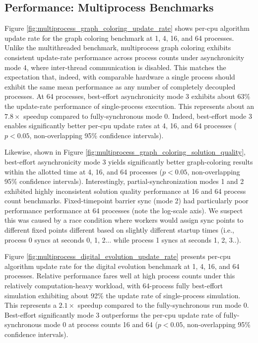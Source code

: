 \subsection{Performance: Multiprocess Benchmarks}



Figure \ref{fig:multiprocess_graph_coloring_update_rate} shows per-cpu algorithm update rate for the graph coloring benchmark at 1, 4, 16, and 64 processes.
Unlike the multithreaded benchmark, multiprocess graph coloring exhibits consistent update-rate performance across process counts under asynchronicity mode 4, where inter-thread communication is disabled.
This matches the expectation that, indeed, with comparable hardware a single process should exhibit the same mean performance as any number of completely decoupled processes.
At 64 processes, best-effort asynchronicity mode 3 exhibits about 63\% the update-rate performance of single-process execution.
This represents about an $7.8\times$ speedup compared to fully-synchronous mode 0.
Indeed, best-effort mode 3 enables significantly better per-cpu update rates at 4, 16, and 64 processes ($p < 0.05$, non-overlapping 95\% confidence intervals).

Likewise, shown in Figure \ref{fig:multiprocess_graph_coloring_solution_quality}, best-effort asynchronicity mode 3 yields significantly better graph-coloring results within the allotted time at 4, 16, and 64 processes ($p < 0.05$, non-overlapping 95\% confidence intervals).
Interestingly, partial-synchronization modes 1 and 2 exhibited highly inconsistent solution quality performance at 16 and 64 process count benchmarks.
Fixed-timepoint barrier sync (mode 2) had particularly poor performance performance at 64 processes (note the log-scale axis).
We suspect this was caused by a race condition where workers would assign sync points to different fixed points different based on slightly different startup times (i.e., process 0 syncs at seconds 0, 1, 2... while process 1 syncs at seconds 1, 2, 3..).

Figure \ref{fig:multiprocess_digital_evolution_update_rate} presents per-cpu algorithm update rate for the digital evolution benchmark at 1, 4, 16, and 64 processes.
Relative performance fares well at high process counts under this relatively computation-heavy workload, with 64-process fully best-effort simulation exhibiting about 92\% the update rate of single-process simulation.
This represents a $2.1\times$ speedup compared to the fully-synchronous run mode 0.
Best-effort significantly mode 3 outperforms the per-cpu update rate of fully-synchronous mode 0 at process counts 16 and 64 ($p < 0.05$, non-overlapping 95\% confidence intervals).

